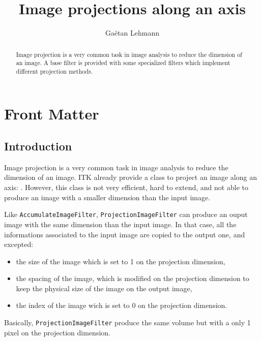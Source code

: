 \documentclass{InsightArticle}
\title{Image projections along an axis}
\author{Ga\"etan Lehmann}
\begin{document}
\maketitle

\ifhtml
\chapter*{Front Matter\label{front}}
\fi


\begin{abstract}
\noindent
Image projection is a very common task in image analysis to reduce the dimension
of an image. A base filter is provided with some specialized filters which
implement different projection methods.
\end{abstract}


\section{Introduction}
Image projection is a very common task in image analysis to reduce the dimension
of an image. ITK already provide a class to project an image along an axis:
. However, this class is not very efficient,
hard to extend, and not able to produce an image with a smaller dimension than
the input image.

Like \verb$AccumulateImageFilter$, \verb$ProjectionImageFilter$ can produce an
ouput image with the same dimension than the input image. In that case, all
the informations associated to the input image are copied to the output one,
and excepted:
\begin{itemize}
  \item the size of the image which is set to 1 on the projection dimension,
  \item the spacing of the image, which is modified on the projection dimension
to keep the physical size of the image on the output image,
  \item the index of the image wich is set to 0 on the projection dimension.
\end{itemize}
Basically, \verb$ProjectionImageFilter$ produce the same volume but with a
only 1 pixel on the projection dimension.
\end{document}
